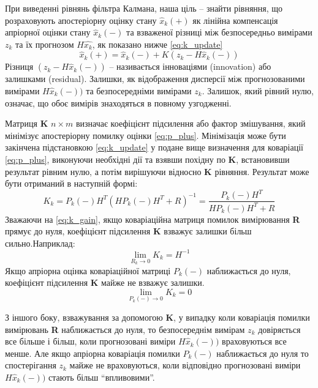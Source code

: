 При виведенні рівнянь фільтра Калмана, наша ціль -- знайти рівняння, що 
розраховують апостеріорну оцінку стану $\hat{x}_{k}(+)$ як лінійна компенсація
апріорної оцінки стану $\hat{x}_{k}(-)$ та взваженої різниці між безпосередньо
вимірами $z_{k}$ та їх прогнозом $H\hat{x_{k}}$, як показано нижче \eqref{eq:k_update}
\begin{equation}
  \label{eq:k_update}
 \hat{x}_{k}(+)= \hat{x}_{k}(-) + K\left(z_{k}-H\hat{x}_{k}(-)\right)
\end{equation}
Різниця $(z_{k}-H\hat{x}_{k}(-))$  -- називається інноваціями (innovation) 
або залишками (residual). Залишки, як відображення дисперсії між прогнозованими
вимірами $H\hat{x}_{k}(-))$ та безпосередніми вимірами $z_{k}$. Залишок, який
рівний нулю, означає, що обоє вимірів знаходяться в повному узгодженні.

Матриця \textbf{K} $n \times m$ визначає коефіцієнт підсилення або фактор
змішування, який мінімізує апостеріорну помилку оцінки \eqref{eq:p_plus}.
Мінімізація може бути закінчена підстановкою \eqref{eq:k_update} у подане 
вище визначення для коваріації \eqref{eq:p_plus}, виконуючи необхідні дії та
взявши похідну по \textbf{K}, встановивши результат рівним нулю, а потім
вирішуючи відносно \textbf{K} рівняння. Результат може бути отриманий в 
наступній формі:
\begin{equation}
  \label{eq:k_gain}
  K_{k}=P_{k}(-)H^{T}(HP_{k}(-)H^{T}+R)^{-1} = \frac{P_{k}(-)H^{T}}{HP_{k}(-)H^{T}+R} 
\end{equation}
Зважаючи на \eqref{eq:k_gain}, якщо коваріаційна матриця помилок вимірювання
\textbf{R} прямує до нуля, коефіцієнт підсилення \textbf{K} взважує залишки 
більш сильно.Наприклад:
\begin{equation}
  \label{eq:lim_R}
  \displaystyle\lim_{R_{k}\to 0} K_{k} = H^{-1}
\end{equation}
Якщо апріорна оцінка коваріаційної матриці $P_{k}(-)$ наближається
до нуля, коефіцієнт підсилення \textbf{K} майже не взважує залишки.
\begin{equation}
  \label{eq:lim_P_minus}
  \displaystyle\lim_{P_{k}(-)\to 0} K_{k} = 0
\end{equation}

З іншого боку, взважування за допомогою \textbf{K}, у випадку коли коваріація 
помилки вимірювань \textbf{R} наближається до нуля, то безпосереднім вимірам
$z_{k}$ довіряється все більше і більш, коли прогнозовані виміри $H\hat{x}_{k}(-))$
враховуються все менше. Але якщо апріорна коваріація помилки $P_{k}(-)$ наближається
до нуля то спостерігання $z_{k}$ майже не враховуються, коли відповідно
прогнозовані виміри $H\hat{x}_{k}(-))$ стають більш ``впливовими''.


